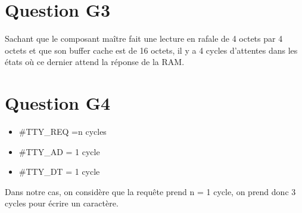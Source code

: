 \documentclass[10pt]{article}
\begin{document}
\section{Question G3}
Sachant que le composant maître fait une lecture en rafale de 4 octets par 4 octets
et que son buffer cache est de 16 octets, il y a 4 cycles d'attentes dans les états
où ce dernier attend la réponse de la RAM.

\section{Question G4}
\begin{itemize}
  \item \#TTY\_REQ ={n} {cycles}
  \item \#TTY\_AD = {1} {cycle}
  \item \#TTY\_DT = {1} {cycle}
\end{itemize}

Dans notre cas, on considère que la requête prend n = 1 cycle, on prend donc 3 cycles
pour écrire un caractère.
\end{document}
